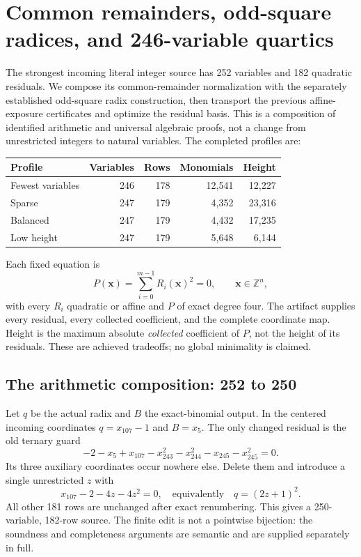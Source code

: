 \section{Common remainders, odd-square radices, and 246-variable quartics}
\label{sec:round19-quartics}

The strongest incoming literal integer source has 252 variables and 182
quadratic residuals.  We compose its common-remainder normalization with the
separately established odd-square radix construction, then transport the
previous affine-exposure certificates and optimize the residual basis.
This is a composition of identified arithmetic and universal algebraic
proofs, not a change from unrestricted integers to natural variables.
The completed profiles are:
\begin{center}
\begin{tabular}{lrrrr}
\hline
Profile & Variables & Rows & Monomials & Height\\
\hline
Fewest variables & 246 & 178 & 12,541 & 12,227\\
Sparse & 247 & 179 & 4,352 & 23,316\\
Balanced & 247 & 179 & 4,432 & 17,235\\
Low height & 247 & 179 & 5,648 & 6,144\\
\hline
\end{tabular}
\end{center}
Each fixed equation is
\[
 P(\mathbf x)=\sum_{i=0}^{m-1}R_i(\mathbf x)^2=0,
 \qquad \mathbf x\in\mathbb Z^n,
\]
with every $R_i$ quadratic or affine and $P$ of exact degree four.
The artifact supplies every residual, every collected coefficient, and the
complete coordinate map.  Height is the maximum absolute \emph{collected}
coefficient of $P$, not the height of its residuals.  These are achieved
tradeoffs; no global minimality is claimed.

\subsection{The arithmetic composition: 252 to 250}
Let $q$ be the actual radix and $B$ the exact-binomial output.
In the centered incoming coordinates $q=x_{107}-1$ and $B=x_5$.
The only changed residual is the old ternary guard
\[
 -2-x_5+x_{107}-x_{243}^2-x_{244}^2-x_{245}-x_{245}^2=0.
\]
Its three auxiliary coordinates occur nowhere else.  Delete them and
introduce a single unrestricted $z$ with
\[
 x_{107}-2-4z-4z^2=0,
 \quad\text{equivalently}\quad q=(2z+1)^2.
\]
All other 181 rows are unchanged after exact renumbering.  This gives a
250-variable, 182-row source.  The finite edit is not a pointwise bijection:
the soundness and completeness arguments are semantic and are supplied
separately in full.

